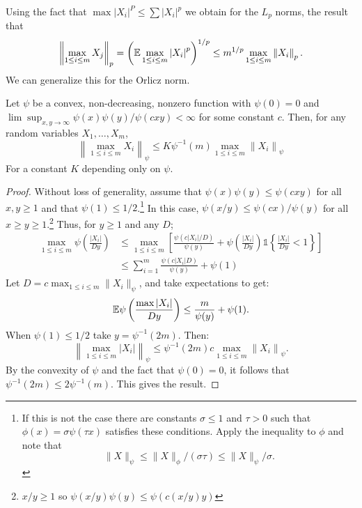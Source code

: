 Using the fact that \(\max|X_i|^P \leq \sum |X_i|^p\) we obtain for the \(L_p\) norms, the result that 
\[
	\left\|\max_{1\leq i\leq m}X_j\right\|_p = \left(\mathbb{E}\max_{1\leq i\leq m}\left|X_i\right|^p\right)^{1/p} \leq m^{1/p}\max_{1\leq i\leq m}\left\|X_i\right\|_p
.\]
We can generalize this for the Orlicz norm.
\begin{lemma}
	\label{lemma:vdv2.2.2}
	Let \(\psi\) be a convex, non-decreasing, nonzero function with  \(\psi(0)=0\) and  \(\lim\sup_{x,y\to\infty}\psi(x)\psi(y)/\psi(cxy)<\infty\) for some constant \(c\). Then, for any random variables  \(X_1,\dots,X_m\),
	\begin{equation}
		\label{eq:vdv2.2.2}
		\left\|\max_{1\leq i\leq m}X_i\right\|_\psi \leq K\psi^{-1}(m)\max_{1\leq i\leq m}\left\|X_i\right\|_\psi
	\end{equation}
	For a constant \(K\) depending only on  \(\psi\).
\end{lemma}

\begin{proof}
	Without loss of generality, assume that  \(\psi(x)\psi(y)\leq \psi(cxy)\) for all \(x,y\geq 1\) and that \(\psi(1)\leq 1/2\).\footnote{If this is not the case there are constants \(\sigma \leq 1\) and \(\tau > 0\) such that  \(\phi(x)=\sigma\psi(\tau x)\) satisfies these conditions. Apply the inequality to  \(\phi\) and note that 
	 \[
		 \|X\|_\psi \leq  \|X\|_\phi/(\sigma\tau)\leq \|X\|_\psi/\sigma
	.\] }
	In this case, \(\psi(x/y)\leq \psi(cx)/\psi(y)\) for all \(x\geq y\geq 1\).\footnote{\(x/y \geq 1\) so \(\psi(x/y)\psi(y) \leq \psi\left(c(x/y)y\right)\)} Thus, for \(y\geq 1\) and any \(D\);
	\begin{align*}
	\max_{1\leq i\leq m}\psi\left(\frac{|X_i|}{Dy}\right) 
	&\leq \max_{1\leq i\leq m}\left[\frac{\psi(c|X_i|/D)}{\psi(y)} + \psi\left(\frac{|X_i|}{Dy}\right)\mathds{1}\left\{\frac{|X_i|}{Dy}<1\right\} \right] \\
	&\leq \sum_{i=1}^m \frac{\psi\left(c|X_i|D\right)}{\psi(y)} + \psi(1) 
	\end{align*}
	Let \(D = c\max_{1\leq i\leq m}\|X_i\|_\psi\), and take expectations to get:
	\[
	    \mathbb{E}\psi\left(\frac{\max|X_i|}{Dy}\right) \leq
		\frac{m}{\psi(y)} + \psi(1) 
	.\] 
	When \(\psi(1)\leq 1/2\) take \(y=\psi^{-1}(2m)\). Then: 
	\[
		\left\|\max_{1\leq i\leq m}\left|X_i\right|\right\|_\psi \leq \psi^{-1}(2m)c\max_{1\leq i\leq m}\left\|X_i\right\|_\psi
	.\] 
	By the convexity of \(\psi\) and the fact that  \(\psi(0)=0\), it follows that  \(\psi^{-1}(2m)\leq 2\psi^{-1}(m)\). This gives the result.
\end{proof}

